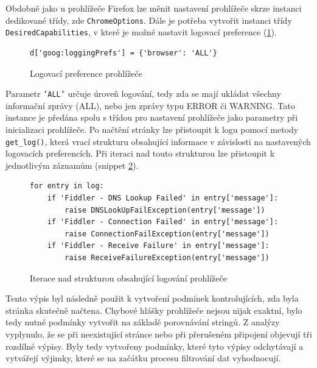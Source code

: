 \documentclass[thesis=M,czech,hidelinks]{FITthesis}[2013/05/06]
\begin{document}
Obdobně jako u prohlížeče Firefox lze měnit nastavení prohlížeče skrze instanci dedikované třídy, zde \texttt{ChromeOptions}. Dále je potřeba vytvořit instanci třídy \texttt{DesiredCapabilities}, v které je možné nastavit logovací preference (\ref{snip:log_pref}).
\begin{figure}[h]               
	\begin{verbatim}
d['goog:loggingPrefs'] = {'browser': 'ALL'}
	\end{verbatim}      
	\caption{Logovací preference prohlížeče}
	\label{snip:log_pref}
\end{figure}
Parametr \texttt{'ALL'} určuje úroveň logování, tedy zda se mají ukládat všechny informační zprávy (ALL), nebo jen zprávy typu ERROR či WARNING.
Tato instance je předána spolu s třídou pro nastavení prohlížeče jako parametry při inicializaci prohlížeče. Po načtění stránky lze přistoupit k logu pomocí metody \texttt{get_log()}, která vrací strukturu obsahující informace v závislosti na nastavených logovacích preferencích. Při iteraci nad touto strukturou lze přistoupit k jednotlivým záznamům (snippet \ref{snip:selenium_logger}). 
\begin{figure}[h]               
	\begin{verbatim}
for entry in log:
    if 'Fiddler - DNS Lookup Failed' in entry['message']:
        raise DNSLookUpFailException(entry['message'])
    if 'Fiddler - Connection Failed' in entry['message']:
        raise ConnectionFailException(entry['message'])
    if 'Fiddler - Receive Failure' in entry['message']:
        raise ReceiveFailureException(entry['message'])
	\end{verbatim}      
	\caption{Iterace nad strukturou obsahující logování prohlížeče}
	\label{snip:selenium_logger}
\end{figure}

Tento výpis byl následně použit k vytvoření podmínek kontrolujících, zda byla stránka skutečně načtena. Chybové hlášky prohlížeče nejsou nijak exaktní, bylo tedy nutné podmínky vytvořit na základě porovnávání stringů. Z analýzy vyplynulo, že se při neexistující stránce nebo při přerušeném připojení objevují tři rozdílné výpisy. Byly tedy vytvořeny podmínky, které tyto výpisy odchytávají a vytvářejí výjimky, které se na začátku procesu filtrování dat vyhodnocují.
\end{document}
